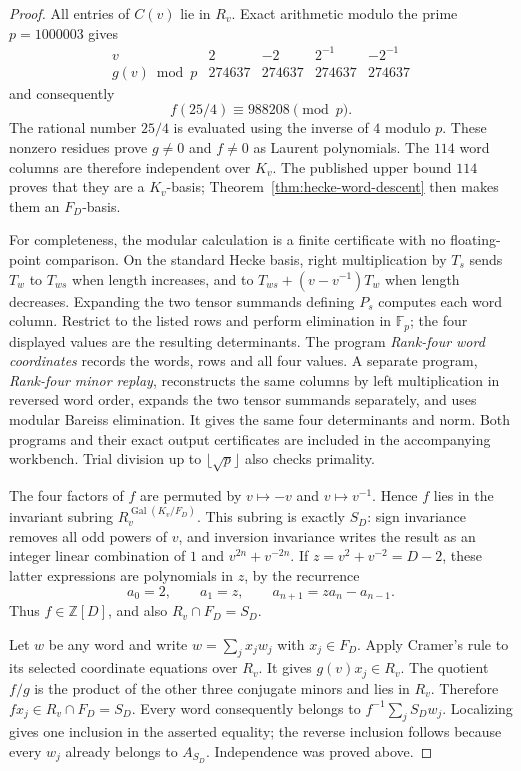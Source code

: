 \begin{proof}
All entries of $C(v)$ lie in $R_v$. Exact arithmetic modulo the prime $p=1000003$ gives
\[
\begin{array}{c|rrrr}
v&2&-2&2^{-1}&-2^{-1}\\\hline
g(v)\bmod p&274637&274637&274637&274637
\end{array}
\]
and consequently
\[
 f(25/4)\equiv988208\pmod p.
\]
The rational number $25/4$ is evaluated using the inverse of $4$ modulo $p$. These nonzero residues prove $g\ne0$ and $f\ne0$ as Laurent polynomials. The $114$ word columns are therefore independent over $K_v$. The published upper bound $114$ proves that they are a $K_v$-basis; Theorem~\ref{thm:hecke-word-descent} then makes them an $F_D$-basis.

For completeness, the modular calculation is a finite certificate with no floating-point comparison. On the standard Hecke basis, right multiplication by $T_s$ sends $T_w$ to $T_{ws}$ when length increases, and to $T_{ws}+(v-v^{-1})T_w$ when length decreases. Expanding the two tensor summands defining $P_s$ computes each word column. Restrict to the listed rows and perform elimination in $\mathbb F_p$; the four displayed values are the resulting determinants. The program \emph{Rank-four word coordinates} records the words, rows and all four values. A separate program, \emph{Rank-four minor replay}, reconstructs the same columns by left multiplication in reversed word order, expands the two tensor summands separately, and uses modular Bareiss elimination. It gives the same four determinants and norm. Both programs and their exact output certificates are included in the accompanying workbench. Trial division up to $\lfloor\sqrt p\rfloor$ also checks primality.

The four factors of $f$ are permuted by $v\mapsto-v$ and $v\mapsto v^{-1}$. Hence $f$ lies in the invariant subring $R_v^{\operatorname{Gal}(K_v/F_D)}$. This subring is exactly $S_D$: sign invariance removes all odd powers of $v$, and inversion invariance writes the result as an integer linear combination of $1$ and $v^{2n}+v^{-2n}$. If $z=v^2+v^{-2}=D-2$, these latter expressions are polynomials in $z$, by the recurrence
\[
 a_0=2,\qquad a_1=z,\qquad a_{n+1}=za_n-a_{n-1}.
\]
Thus $f\in\mathbb Z[D]$, and also $R_v\cap F_D=S_D$.

Let $w$ be any word and write $w=\sum_jx_jw_j$ with $x_j\in F_D$. Apply Cramer's rule to its selected coordinate equations over $R_v$. It gives $g(v)x_j\in R_v$. The quotient $f/g$ is the product of the other three conjugate minors and lies in $R_v$. Therefore $fx_j\in R_v\cap F_D=S_D$. Every word consequently belongs to $f^{-1}\sum_jS_Dw_j$. Localizing gives one inclusion in the asserted equality; the reverse inclusion follows because every $w_j$ already belongs to $A_{S_D}$. Independence was proved above.
\end{proof}

